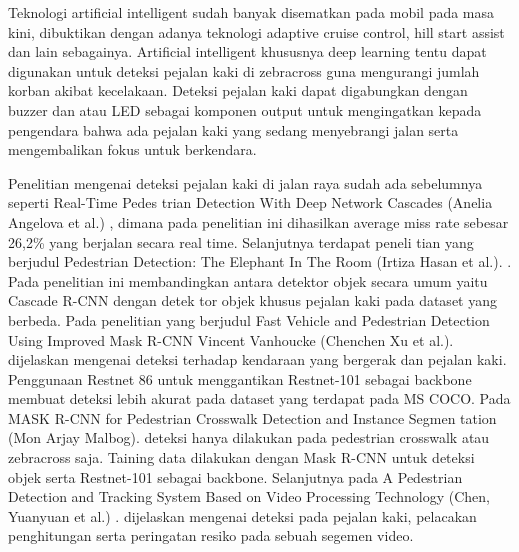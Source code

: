\documentclass[conference]{IEEEtran}
\begin{document}
	\vspace{1ex}
	
	Teknologi artificial intelligent sudah banyak disematkan pada mobil pada masa kini, dibuktikan dengan adanya teknologi adaptive cruise control, hill start assist dan lain sebagainya. Artificial intelligent khususnya deep learning tentu dapat digunakan untuk deteksi pejalan kaki di zebracross guna mengurangi jumlah korban akibat kecelakaan. Deteksi pejalan kaki dapat digabungkan dengan buzzer dan atau LED sebagai komponen output untuk mengingatkan kepada pengendara bahwa ada pejalan kaki yang sedang menyebrangi jalan serta mengembalikan fokus untuk berkendara.
	
	\vspace{1ex} 
	
	Penelitian mengenai deteksi pejalan kaki di jalan raya sudah ada sebelumnya seperti Real-Time Pedes trian Detection With Deep Network Cascades (Anelia Angelova et al.) \cite{cit:1}, dimana pada penelitian ini dihasilkan average miss rate sebesar 26,2\% yang berjalan secara real time. Selanjutnya terdapat peneli tian yang berjudul Pedestrian Detection: The Elephant In The Room (Irtiza Hasan et al.). \cite{cit:2}. Pada penelitian ini membandingkan antara detektor objek secara umum yaitu Cascade R-CNN dengan detek tor objek khusus pejalan kaki pada dataset yang berbeda. Pada penelitian yang berjudul Fast Vehicle and Pedestrian Detection Using Improved Mask R-CNN Vincent Vanhoucke (Chenchen Xu et al.). \cite{cit:3} dijelaskan mengenai deteksi terhadap kendaraan yang bergerak dan pejalan kaki. Penggunaan Restnet 86 untuk menggantikan Restnet-101 sebagai backbone membuat deteksi lebih akurat pada dataset yang terdapat pada MS COCO. Pada MASK R-CNN for Pedestrian Crosswalk Detection and Instance Segmen tation (Mon Arjay Malbog). \cite{cit:4} deteksi hanya dilakukan pada pedestrian crosswalk atau zebracross saja. Taining data dilakukan dengan Mask R-CNN untuk deteksi objek serta Restnet-101 sebagai backbone. Selanjutnya pada A Pedestrian Detection and Tracking System Based on Video Processing Technology (Chen, Yuanyuan et al.) \cite{cit:5}. dijelaskan mengenai deteksi pada pejalan kaki, pelacakan penghitungan serta peringatan resiko pada sebuah segemen video. 
	
\end{document}
